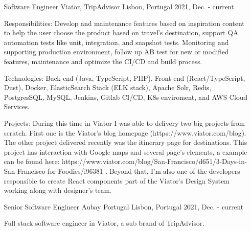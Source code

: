 

\begin{cventries}

  \cventry
    {Software Engineer} %
    {Viator, TripAdvisor} %
    {Lisbon, Portugal} %
    {2021, Dec. - current} %
    {
      \begin{cvitems} %
        \item {Responsibilities: Develop and maintenance features based on inspiration content to help the user choose the product based on travel's destination, support QA automation tests like unit, integration, and snapshot tests. Monitoring and supporting production environment, follow up AB test for new or modified features, maintenance and optimize the CI/CD and build process.}
        \item {Technologies: Back-end (Java, TypeScript, PHP), Front-end (React/TypeScript, Dust), Docker, ElasticSearch Stack (ELK stack), Apache Solr, Redis, PostgresSQL, MySQL, Jenkins, Gitlab CI/CD, K8s enviroment, and AWS Cloud Services.}
        \item {Projects: During this time in Viator I was able to delivery two big projects from scratch. First one is the Viator's blog homepage (https://www.viator.com/blog). The other project delivered recently was the itinerary page for destinations. This project has interaction with Google maps and several page's elements, a example can be found here: https://www.viator.com/blog/San-Francisco/d651/3-Days-in-San-Francisco-for-Foodies/i96381 . Beyond that, I'm also one of the developers responsible to create React components part of the Viator's Design System working along with designer's team.}
      \end{cvitems}
    }

  \cventry
    {Senior Software Engineer} %
    {Aubay Portugal} %
    {Lisbon, Portugal} %
    {2021, Dec. - current} %
    {
      \begin{cvitems} %
        \item {Full stack software engineer in Viator, a sub brand of TripAdvisor.}
      \end{cvitems}
    }


\end{cventries}
